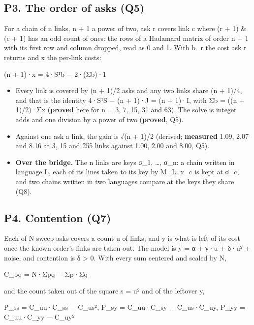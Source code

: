 \subsection{\texorpdfstring{P3. The order of asks (Q5)}{P3. The order of asks (Q5)}}

For a chain of n links, n + 1 a power of two, ask r covers link c where (r + 1) \& (c + 1) has an odd count of ones: the rows of a Hadamard matrix of order n + 1 with its first row and column dropped, read as 0 and 1. With b\_\allowbreak{}r the cost ask r returns and x the per-link costs:

(n + 1)·x = 4·Sᵀb − 2·(Σb)·1

\begin{itemize}
\item Every link is covered by (n + 1)/2 asks and any two links share (n + 1)/4, and that is the identity 4·SᵀS − (n + 1)·J = (n + 1)·I, with Σb = ((n + 1)/2)·Σx (\textbf{proved} here for n = 3, 7, 15, 31 and 63). The solve is integer adds and one division by a power of two (\textbf{proved}, Q5).
\item Against one ask a link, the gain is √(n + 1)/2 (derived; \textbf{measured} 1.09, 2.07 and 8.16 at 3, 15 and 255 links against 1.00, 2.00 and 8.00, Q5).
\item \textbf{Over the bridge.} The n links are keys σ\_\allowbreak{}1, …, σ\_\allowbreak{}n: a chain written in language L, each of its lines taken to its key by M\_\allowbreak{}L. x\_\allowbreak{}c is kept at σ\_\allowbreak{}c, and two chains written in two languages compare at the keys they share (Q8).
\end{itemize}

\subsection{\texorpdfstring{P4. Contention (Q7)}{P4. Contention (Q7)}}

Each of N sweep asks covers a count u of links, and y is what is left of its cost once the known order's links are taken out. The model is y = α + γ·u + δ·u² + noise, and contention is δ > 0. With every sum centered and scaled by N,

C\_\allowbreak{}pq = N·Σpq − Σp·Σq

and the count taken out of the square s = u² and of the leftover y,

P\_\allowbreak{}ss = C\_\allowbreak{}uu·C\_\allowbreak{}ss − C\_\allowbreak{}us²,  P\_\allowbreak{}sy = C\_\allowbreak{}uu·C\_\allowbreak{}sy − C\_\allowbreak{}us·C\_\allowbreak{}uy,  P\_\allowbreak{}yy = C\_\allowbreak{}uu·C\_\allowbreak{}yy − C\_\allowbreak{}uy²

